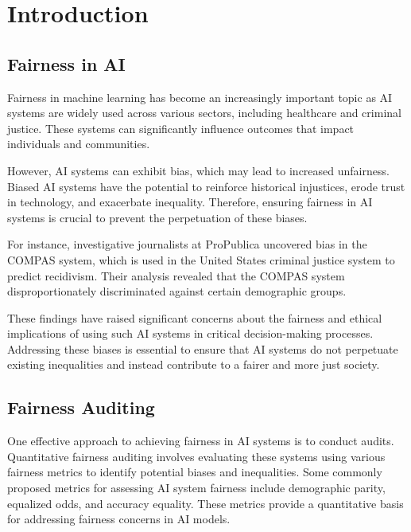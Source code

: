 \documentclass[manuscript,screen,review,anonymous]{acmart}
\begin{document}


\maketitle

\section{Introduction}


\subsection{Fairness in AI}

Fairness in machine learning has become an increasingly important topic as AI systems are widely used across various sectors, including healthcare and criminal justice. These systems can significantly influence outcomes that impact individuals and communities.

However, AI systems can exhibit bias, which may lead to increased unfairness. Biased AI systems have the potential to reinforce historical injustices, erode trust in technology, and exacerbate inequality. Therefore, ensuring fairness in AI systems is crucial to prevent the perpetuation of these biases.

For instance, investigative journalists at ProPublica uncovered bias in the COMPAS system, which is used in the United States criminal justice system to predict recidivism. Their analysis revealed that the COMPAS system disproportionately discriminated against certain demographic groups.

These findings have raised significant concerns about the fairness and ethical implications of using such AI systems in critical decision-making processes. Addressing these biases is essential to ensure that AI systems do not perpetuate existing inequalities and instead contribute to a fairer and more just society.

\subsection{Fairness Auditing}

One effective approach to achieving fairness in AI systems is to conduct audits. Quantitative fairness auditing involves evaluating these systems using various fairness metrics to identify potential biases and inequalities. Some commonly proposed metrics for assessing AI system fairness include demographic parity, equalized odds, and accuracy equality. These metrics provide a quantitative basis for addressing fairness concerns in AI models.
\end{document}
